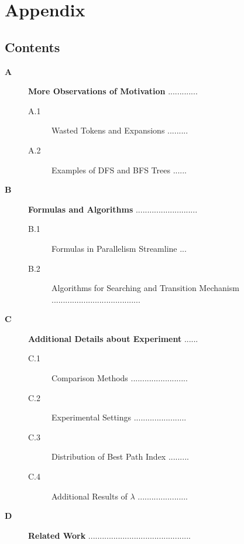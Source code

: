 \newpage

\section*{Appendix}
\label{sec:appendix}

\subsection*{Contents}
\begin{description}
    \item [\textbf{A}] \textbf{More Observations of Motivation} .............  \pageref{sec:app:motivation}
        \begin{description}
            \item [A.1] Wasted Tokens and Expansions ......... \pageref{sec:app:wasted}
            \item [A.2] Examples of DFS and BFS Trees ...... \pageref{sec:app:trees}
        \end{description}
    \item [\textbf{B}] \textbf{Formulas and Algorithms} ........................... \pageref{sec:app:formulas_and_algorithms}
        \begin{description}
            \item[B.1] Formulas in Parallelism Streamline ... \pageref{app:sec:parallel_reasoning}
            \item[B.2] Algorithms for Searching and Transition Mechanism ....................................... \pageref{sec:app:algorithms}
        \end{description}
    \item [\textbf{C}] \textbf{Additional Details about Experiment} ...... \pageref{app:sec:exp}
        \begin{description}
            \item [C.1] Comparison Methods ......................... \pageref{app:sec:comparison_methods}
            \item [C.2] Experimental Settings ....................... \pageref{app:sec:exp_setting}
            \item [C.3] Distribution of Best Path Index ......... \pageref{app:sec:best_path_index}
            \item [C.4] Additional Results of $\lambda$ ...................... \pageref{sec:app:hyperparameter}
        \end{description}
    \item [\textbf{D}] \textbf{Related Work} ............................................. \pageref{app:sec:related_work}
\end{description}

